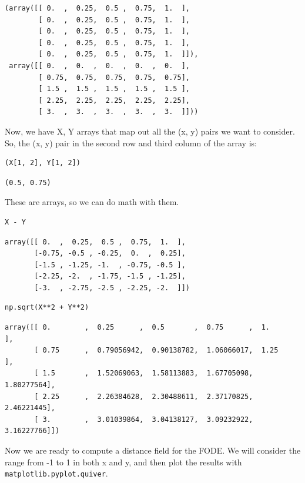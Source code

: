 \documentclass[11pt]{article}
\begin{document}
\begin{verbatim}
(array([[ 0.  ,  0.25,  0.5 ,  0.75,  1.  ],
        [ 0.  ,  0.25,  0.5 ,  0.75,  1.  ],
        [ 0.  ,  0.25,  0.5 ,  0.75,  1.  ],
        [ 0.  ,  0.25,  0.5 ,  0.75,  1.  ],
        [ 0.  ,  0.25,  0.5 ,  0.75,  1.  ]]),
 array([[ 0.  ,  0.  ,  0.  ,  0.  ,  0.  ],
        [ 0.75,  0.75,  0.75,  0.75,  0.75],
        [ 1.5 ,  1.5 ,  1.5 ,  1.5 ,  1.5 ],
        [ 2.25,  2.25,  2.25,  2.25,  2.25],
        [ 3.  ,  3.  ,  3.  ,  3.  ,  3.  ]]))
\end{verbatim}

Now, we have X, Y arrays that map out all the (x, y) pairs we want to consider. So, the (x, y) pair in the second row and third column of the array is:

\begin{verbatim}
(X[1, 2], Y[1, 2])
\end{verbatim}

\begin{verbatim}
(0.5, 0.75)
\end{verbatim}

These are arrays, so we can do math with them.

\begin{verbatim}
X - Y
\end{verbatim}

\begin{verbatim}
array([[ 0.  ,  0.25,  0.5 ,  0.75,  1.  ],
       [-0.75, -0.5 , -0.25,  0.  ,  0.25],
       [-1.5 , -1.25, -1.  , -0.75, -0.5 ],
       [-2.25, -2.  , -1.75, -1.5 , -1.25],
       [-3.  , -2.75, -2.5 , -2.25, -2.  ]])
\end{verbatim}

\begin{verbatim}
np.sqrt(X**2 + Y**2)
\end{verbatim}

\begin{verbatim}
array([[ 0.        ,  0.25      ,  0.5       ,  0.75      ,  1.        ],
       [ 0.75      ,  0.79056942,  0.90138782,  1.06066017,  1.25      ],
       [ 1.5       ,  1.52069063,  1.58113883,  1.67705098,  1.80277564],
       [ 2.25      ,  2.26384628,  2.30488611,  2.37170825,  2.46221445],
       [ 3.        ,  3.01039864,  3.04138127,  3.09232922,  3.16227766]])
\end{verbatim}


Now we are ready to compute a distance field for the FODE. We will consider the range from -1 to 1 in both x and y, and then plot the results with \texttt{matplotlib.pyplot.quiver}.
\end{document}
